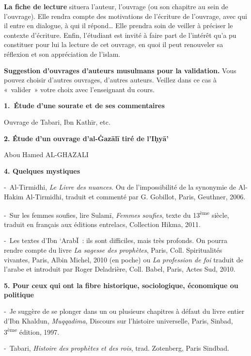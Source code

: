 \textbf{La fiche de lecture} situera l'auteur, l'ouvrage (ou son
chapitre au sein de l'ouvrage). Elle rendra compte des motivations de
l'écriture de l'ouvrage, avec qui il entre en dialogue, à qui il
répond\ldots{} Elle prendra soin de veiller à préciser le contexte
d'écriture. Enfin, l'étudiant est invité à faire part de l'intérêt qu'a
pu constituer pour lui la lecture de cet ouvrage, en quoi il peut
renouveler sa réflexion et son appréciation de l'islam.

\textbf{Suggestion d'ouvrages d'auteurs musulmans pour la validation.}
Vous pouvez choisir d'autres ouvrages, d'autres auteurs. Veillez dans ce
cas à «~valider~» votre choix avec l'enseignant du cours.


\textbf{1.~Étude d'une sourate et de ses commentaires}

Ouvrage de Tabari, Ibn Kathīr, etc.

\textbf{2. Étude d'un ouvrage d'al-Ġazālī tiré de l'Iḥyā'}



Abou Hamed AL-GHAZALI



\textbf{4. Quelques mystiques}

-~Al-Tirmidhi, \emph{Le Livre des nuances}. Ou de l'impossibilité de la
synonymie de Al-Hakim Al-Tirmidhi, traduit et commenté par G. Gobillot,
Paris, Geuthner, 2006.

-~Sur les femmes soufies, lire Sulamī, \emph{Femmes soufies}, texte du
13\textsuperscript{ème} siècle, traduit en français aux éditions
entrelacs, Collection Hikma, 2011.

-~Les textes d'Ibn `ArabĪ~: ils sont difficiles, mais très profonds. On
pourra rendre compte du livre \emph{La sagesse des prophètes}, Paris,
Coll. Spiritualités vivantes, Paris, Albin Michel, 2010 (en poche) ou
\emph{La profession de foi} traduit de l'arabe et introduit par Roger
Deladrière, Coll. Babel, Paris, Actes Sud, 2010.

\textbf{5. Pour ceux qui ont la fibre historique, sociologique,
économique ou politique}

-~Je suggère de se plonger dans un ou plusieurs chapitres à défaut du
livre entier d'Ibn Khaldun, \emph{Muqqadima}, Discours sur l'histoire
universelle, Paris, Sinbad, 3\textsuperscript{ème} édition, 1997.

-~Tabari, \emph{Histoire des prophètes et des rois}, trad. Zotenberg,
Paris Sindbad.



